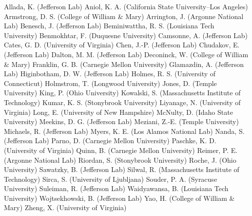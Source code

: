 Allada, K. (Jefferson Lab)
Aniol, K. A. (California State University--Los Angeles)
Armstrong, D. S. (College of William \& Mary)
Arrington, J. (Argonne National Lab)
Benesch, J. (Jefferson Lab)
Beminiwattha, R. S. (Louisiana Tech University)
Benmokhtar, F. (Duquesne University)
Camsonne, A. (Jefferson Lab)
Cates, G. D. (University of Virginia)
Chen, J.-P. (Jefferson Lab)
Chudakov, E. (Jefferson Lab)
Dalton, M. M. (Jefferson Lab)
Deconinck, W. (College of William \& Mary)
Franklin, G. B. (Carnegie Mellon University)
Glamazdin, A. (Jefferson Lab)
Higinbotham, D. W. (Jefferson Lab)
Holmes, R. S. (University of Connecticut)
Holmstrom, T. (Longwood University)
Jones, D. (Temple University)
King, P. (Ohio University)
Kowalski, S. (Massachusetts Institute of Technology)
Kumar, K. S. (Stonybrook University)
Liyanage, N. (University of Virginia)
Long, E. (University of New Hampshire)
McNulty, D. (Idaho State University)
Meekins, D. G. (Jefferson Lab)
Meziani, Z.-E. (Temple University)
Michaels, R. (Jefferson Lab)
Myers, K. E. (Los Alamos National Lab)
Nanda, S. (Jefferson Lab)
Parno, D. (Carnegie Mellon University)
Paschke, K. D. (University of Virginia)
Quinn, B. (Carnegie Mellon University)
Reimer, P. E. (Argonne National Lab)
Riordan, S. (Stonybrook University)
Roche, J. (Ohio University)
Sawatzky, B. (Jefferson Lab)
Silwal, R. (Massachusetts Institute of Technology)
Sirca, S. (University of Ljubljana)
Souder, P. A. (Syracuse University)
Suleiman, R. (Jefferson Lab)
Waidyawansa, B. (Louisiana Tech University)
Wojtsekhowski, B. (Jefferson Lab)
Yao, H. (College of William \& Mary)
Zheng, X. (University of Virginia)
